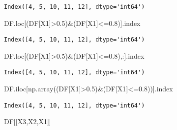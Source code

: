 \documentclass[
  a4paper,
  DIV=11,
  numbers=noendperiod]{scrreprt}
\newenvironment{Shaded}{\begin{snugshade}}{\end{snugshade}}
\newcommand{\FloatTok}[1]{\textcolor[rgb]{0.68,0.00,0.00}{#1}}
\newcommand{\NormalTok}[1]{\textcolor[rgb]{0.00,0.23,0.31}{#1}}
\newcommand{\OperatorTok}[1]{\textcolor[rgb]{0.37,0.37,0.37}{#1}}
\newcommand{\StringTok}[1]{\textcolor[rgb]{0.13,0.47,0.30}{#1}}
\begin{document}
\begin{verbatim}
Index([4, 5, 10, 11, 12], dtype='int64')
\end{verbatim}

\begin{Shaded}
\begin{Highlighting}[]
\NormalTok{DF.loc[(DF[}\StringTok{\textquotesingle{}X1\textquotesingle{}}\NormalTok{]}\OperatorTok{\textgreater{}}\FloatTok{0.5}\NormalTok{)}\OperatorTok{\&}\NormalTok{(DF[}\StringTok{\textquotesingle{}X1\textquotesingle{}}\NormalTok{]}\OperatorTok{\textless{}=}\FloatTok{0.8}\NormalTok{)].index}
\end{Highlighting}
\end{Shaded}

\begin{verbatim}
Index([4, 5, 10, 11, 12], dtype='int64')
\end{verbatim}

\begin{Shaded}
\begin{Highlighting}[]
\NormalTok{DF.loc[(DF[}\StringTok{\textquotesingle{}X1\textquotesingle{}}\NormalTok{]}\OperatorTok{\textgreater{}}\FloatTok{0.5}\NormalTok{)}\OperatorTok{\&}\NormalTok{(DF[}\StringTok{\textquotesingle{}X1\textquotesingle{}}\NormalTok{]}\OperatorTok{\textless{}=}\FloatTok{0.8}\NormalTok{),:].index}
\end{Highlighting}
\end{Shaded}

\begin{verbatim}
Index([4, 5, 10, 11, 12], dtype='int64')
\end{verbatim}

\begin{Shaded}
\begin{Highlighting}[]
\NormalTok{DF.iloc[np.array((DF[}\StringTok{\textquotesingle{}X1\textquotesingle{}}\NormalTok{]}\OperatorTok{\textgreater{}}\FloatTok{0.5}\NormalTok{)}\OperatorTok{\&}\NormalTok{(DF[}\StringTok{\textquotesingle{}X1\textquotesingle{}}\NormalTok{]}\OperatorTok{\textless{}=}\FloatTok{0.8}\NormalTok{))].index}
\end{Highlighting}
\end{Shaded}

\begin{verbatim}
Index([4, 5, 10, 11, 12], dtype='int64')
\end{verbatim}

\begin{Shaded}
\begin{Highlighting}[]
\NormalTok{DF[[}\StringTok{\textquotesingle{}X3\textquotesingle{}}\NormalTok{,}\StringTok{\textquotesingle{}X2\textquotesingle{}}\NormalTok{,}\StringTok{\textquotesingle{}X1\textquotesingle{}}\NormalTok{]]}
\end{Highlighting}
\end{Shaded}
\end{document}
